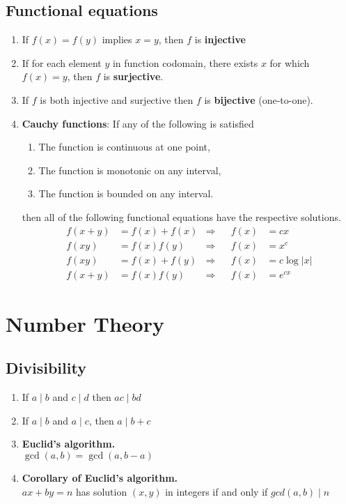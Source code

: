 \documentclass{article}
\begin{document}
  \subsection{Functional equations}
    \begin{enumerate}
      \item
      If $f(x)=f(y)$ implies $x=y$, then $f$ is \textbf{injective}
      \item
      If for each element $y$ in function codomain, there exists $x$ for which $f(x)=y$, then $f$ is \textbf{surjective}.
      \item
      If $f$ is both injective and surjective then $f$ is \textbf{bijective} (one-to-one).
      \item \textbf{Cauchy functions}: If any of the following is satisfied
      \begin{enumerate}
        \item The function is continuous at one point,
        \item The function is monotonic on any interval,
        \item The function is bounded on any interval.
      \end{enumerate}
      then all of the following functional equations have the respective solutions.
      \begin{align}
         f(x+y) &= f(x) + f(x) & \Rightarrow && f(x) &= cx \\
         f(xy)  &= f(x)f(y)    & \Rightarrow && f(x) &= x^c \\
         f(xy)  &= f(x) +f(y)  & \Rightarrow && f(x) &= c \log |x| \\
         f(x+y) &= f(x)f(y)    & \Rightarrow && f(x) &= e^{cx}
      \end{align}
    \end{enumerate}
\newpage
\section{Number Theory}
  \subsection{Divisibility}
    \begin{enumerate}
      \item
      If $a \mid b$ and $ c \mid d$ then $ac \mid bd$
      \item
      If $a \mid b$ and $a \mid c$, then $a \mid b+c$
      \item
      \textbf{Euclid's algorithm.} \\
      $\gcd (a,b) = \gcd (a,b-a)$
      \item
      \textbf{Corollary of Euclid's algorithm.} \\
      $ax+by=n$ has solution $(x,y)$ in integers if and only if $gcd(a,b) \mid n$
    \end{enumerate}
\end{document}
